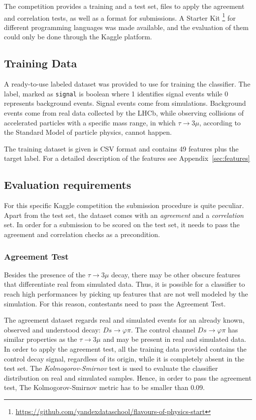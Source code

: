 \documentclass[conference]{IEEEtran}
\begin{document}
The competition provides a training and a test set, files to apply the agreement and correlation tests, as well as a format for submissions. A Starter Kit \footnote{\url{https://github.com/yandexdataschool/flavours-of-physics-start}} for different programming languages was made available, and the evaluation of them could only be done through the Kaggle platform. 

\subsection{Training Data}
A ready-to-use labeled dataset was provided to use for training the classifier. The label, marked as \texttt{signal} is boolean where 1 identifies signal events while 0 represents background events. Signal events come from simulations. Background events come from real data collected by the LHCb, while observing collisions of accelerated particles with a specific mass range, in which $\tau \rightarrow 3\mu$, according to the Standard Model of particle physics, cannot happen.

The training dataset is given is CSV format and contains 49 features plus the target label. For a detailed description of the features see Appendix~\ref{sec:features}

\subsection{Evaluation requirements}
For this specific Kaggle competition the submission procedure is quite peculiar. Apart from the test set, the dataset comes with an \textit{agreement} and a \textit{correlation} set. In order for a submission to be scored on the test set, it needs to pass the agreement and correlation checks as a precondition.

\subsubsection{Agreement Test}
\label{sec:agreement}
Besides the presence of the $\tau \rightarrow 3\mu$ decay, there may be other obscure features that differentiate real from simulated data. Thus, it is possible for a classifier to reach high performances by picking up features that are not well modeled by the simulation. For this reason, contestants need to pass the Agreement Test.

The agreement dataset regards real and simulated events for an already known, observed and understood decay: $Ds \rightarrow \varphi\pi$. The control channel $Ds
\rightarrow \varphi\pi$ has similar properties as the $\tau \rightarrow 3\mu$ and may be present in real and simulated data. In order to apply the agreement test, all the training data provided contains the control decay signal, regardless of its origin, while it is completely absent in the test set. The \textit{Kolmogorov-Smirnov} test is used to evaluate the classifier distribution on real and simulated samples. Hence, in order to pass the agreement test, The Kolmogorov-Smirnov metric has to be smaller than 0.09.
\end{document}
